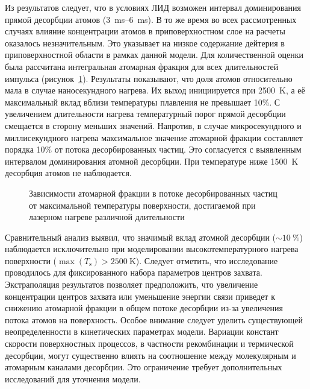 Из результатов следует, что в условиях ЛИД возможен интервал доминирования прямой десорбции атомов (\SIrange{3}{6}{\milli\second}). В то же время во всех рассмотренных случаях влияние концентрации атомов в приповерхностном слое на расчеты оказалось незначительным. Это указывает на низкое содержание дейтерия в приповерхностной области в рамках данной модели. Для количественной оценки была рассчитана интегральная атомарная фракция для всех длительностей импульса (рисунок~\cref{fig:ch4/LID_atomic_fraction}). Результаты показывают, что доля атомов относительно мала в случае наносекундного нагрева. Их выход инициируется при \SI{2500}{\kelvin}, а её максимальный вклад вблизи температуры плавления не превышает 10\%. С увеличением длительности нагрева температурный порог прямой десорбции смещается в сторону меньших значений. Напротив, в случае микросекундного и миллисекундного нагрева максимальное значение атомарной фракции составляет порядка 10\% от потока десорбированных частиц. Это согласуется с выявленным интервалом доминирования атомной десорбции. При температуре ниже \SI{1500}{\kelvin} десорбция атомов не наблюдается.

\begin{figure}[ht]
    \caption{Зависимости атомарной фракции в потоке десорбированных частиц от максимальной температуры поверхности, достигаемой при лазерном нагреве различной длительности}\label{fig:ch4/LID_atomic_fraction}
\end{figure}

Сравнительный анализ выявил, что значимый вклад атомной десорбции ($\sim\SI{10}{\percent}$) наблюдается исключительно при моделировании высокотемпературного нагрева поверхности ($\max(T_\mathrm{s})>\SI{2500}{\kelvin}$). Следует отметить, что исследование проводилось для фиксированного набора параметров центров захвата. Экстраполяция результатов позволяет предположить, что увеличение концентрации центров захвата или уменьшение энергии связи приведет к снижению атомарной фракции в общем потоке десорбции из-за увеличения потока атомов на поверхность. Особое внимание следует уделить существующей неопределенности в кинетических параметрах модели. Вариации констант скорости поверхностных процессов, в частности рекомбинации и термической десорбции, могут существенно влиять на соотношение между молекулярным и атомарным каналами десорбции. Это ограничение требует дополнительных исследований для уточнения модели.


